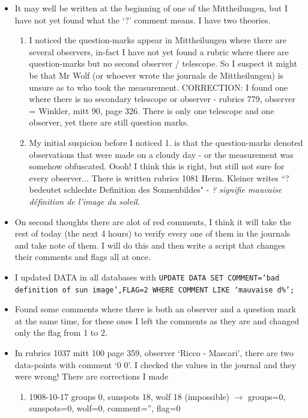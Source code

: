 \documentclass[12pt]{article}
\begin{document}
\begin{itemize}
\begin{itemize}
        \item It may well be written at the beginning of one of the Mittheilungen, but I have not yet found what the `?' comment means. I have two theories.\label{what is flag 2 question mark}
        \begin{enumerate}
            \item I noticed the question-marks appear in Mittheilungen where there are several observers, in-fact I have not yet found a rubric where there are question-marks but no second observer / telescope. So I suspect it might be that Mr Wolf (or whoever wrote the journals de Mittheilungen) is unsure as to who took the measurement. CORRECTION: I found one where there is no secondary telescope or observer - rubrics 779, observer = Winkler, mitt 90, page 326. There is only one telescope and one observer, yet there are still question marks.
            \item My initial suspicion before I noticed 1. is that the question-marks denoted observations that were made on a cloudy day - or the measurement was somehow obfuscated. Oooh! I think this is right, but still not sure for every observer... There is written rubrics 1081 Herm. Kleiner writes ``? bedeutet schlechte Definition des Sonnenbildes" - \textit{? signifie mauvaise définition de l'image du soleil}.
        \end{enumerate}
        \item On second thoughts there are alot of red comments, I think it will take the rest of today (the next 4 hours) to verify every one of them in the journals and take note of them. I will do this and then write a script that changes their comments and flags all at once.
        \item I updated DATA in all databases with \texttt{UPDATE DATA SET COMMENT=`bad definition of sun image',FLAG=2 WHERE COMMENT LIKE `mauvaise d\%';}
        \item Found some comments where there is both an observer and a question mark at the same time, for these ones I left the comments as they are and changed only the flag from 1 to 2.
        \item In rubrics 1037 mitt 100 page 359, observer `Ricco - Mascari', there are two data-points with comment `0 0'. I checked the values in the journal and they were wrong! There are corrections I made
        \begin{enumerate}
            \item 1908-10-17 groups 0, sunspots 18, wolf 18 (impossible) $\to$ groups=0, sunspots=0, wolf=0, comment='', flag=0

\end{enumerate}
\end{itemize}
\end{itemize}
\end{document}
